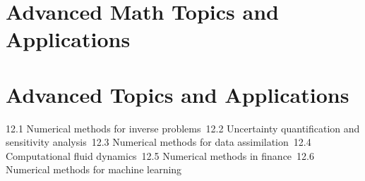 \section{Advanced Math Topics and Applications}
\section{Advanced Topics and Applications}
12.1 Numerical methods for inverse problems\
12.2 Uncertainty quantification and sensitivity analysis\
12.3 Numerical methods for data assimilation\
12.4 Computational fluid dynamics\
12.5 Numerical methods in finance\
12.6 Numerical methods for machine learning\
